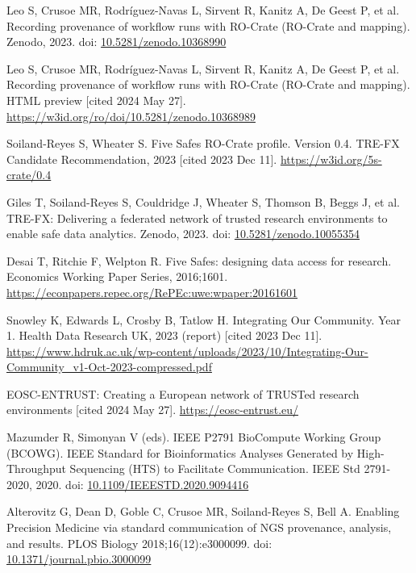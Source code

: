 \documentclass[10pt,letterpaper]{article}
\begin{document}
\begin{thebibliography}{10}
\begin{small}
Leo S, Crusoe MR, Rodríguez-Navas L, Sirvent R, Kanitz A, De Geest P, et al.
Recording provenance of workflow runs with RO-Crate (RO-Crate and mapping).
Zenodo, 2023.
doi: \href{https://doi.org/10.5281/zenodo.10368990}{10.5281/zenodo.10368990}

Leo S, Crusoe MR, Rodríguez-Navas L, Sirvent R, Kanitz A, De Geest P, et al.
Recording provenance of workflow runs with RO-Crate (RO-Crate and mapping). HTML preview [cited 2024 May 27].
\url{https://w3id.org/ro/doi/10.5281/zenodo.10368989}

Soiland-Reyes S, Wheater S.
Five Safes RO-Crate profile. Version 0.4.
TRE-FX Candidate Recommendation, 2023 [cited 2023 Dec 11].
\url{https://w3id.org/5s-crate/0.4}

Giles T, Soiland-Reyes S, Couldridge J, Wheater S, Thomson B, Beggs J, et al.
TRE-FX: Delivering a federated network of trusted research environments to enable safe data analytics.
Zenodo, 2023.
doi: \href{https://doi.org/10.5281/zenodo.10055354}{10.5281/zenodo.10055354}

Desai T, Ritchie F, Welpton R.
Five Safes: designing data access for research.
Economics Working Paper Series, 2016;1601.
\url{https://econpapers.repec.org/RePEc:uwe:wpaper:20161601}

Snowley K, Edwards L, Crosby B, Tatlow H.
Integrating Our Community. Year 1.
Health Data Research UK, 2023 (report) [cited 2023 Dec 11].
\url{https://www.hdruk.ac.uk/wp-content/uploads/2023/10/Integrating-Our-Community_v1-Oct-2023-compressed.pdf}

EOSC-ENTRUST: Creating a European network of TRUSTed research environments [cited 2024 May 27].
\url{https://eosc-entrust.eu/}

Mazumder R, Simonyan V (eds). IEEE P2791 BioCompute Working Group (BCOWG).
IEEE Standard for Bioinformatics Analyses Generated by High-Throughput Sequencing (HTS) to Facilitate Communication.
IEEE Std 2791-2020, 2020.
doi: \href{https://doi.org/10.1109/IEEESTD.2020.9094416}{10.1109/IEEESTD.2020.9094416}

Alterovitz G, Dean D, Goble C, Crusoe MR, Soiland-Reyes S, Bell A.
Enabling Precision Medicine via standard communication of NGS provenance, analysis, and results.
PLOS Biology 2018;16(12):e3000099.
doi: \href{https://doi.org/10.1371/journal.pbio.3000099}{10.1371/journal.pbio.3000099}


\end{small}
\end{thebibliography}
\end{document}
